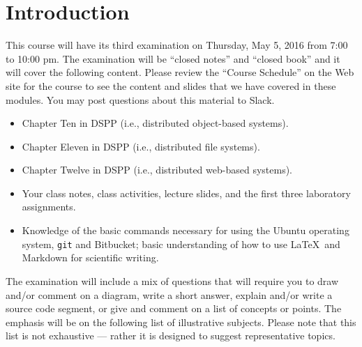 


\vspace*{-.35in}
\section*{Introduction}
\vspace*{-.05in}

This course will have its third examination on Thursday, May 5, 2016 from 7:00 to 10:00 pm. The examination will be
``closed notes'' and ``closed book'' and it will cover the following content. Please review the ``Course Schedule'' on
the Web site for the course to see the content and slides that we have covered in these modules. You may post questions
about this material to Slack.

\vspace*{-.05in}

\begin{itemize}

  \itemsep 0in

  \item Chapter Ten in DSPP (i.e., distributed object-based systems).

  \item Chapter Eleven in DSPP (i.e., distributed file systems).

  \item Chapter Twelve in DSPP (i.e., distributed web-based systems).

  \item Your class notes, class activities, lecture slides, and the first three laboratory assignments.

  \item Knowledge of the basic commands necessary for using the Ubuntu operating system, {\tt git} and Bitbucket; basic
    understanding of how to use \LaTeX~and Markdown for scientific writing.

\end{itemize}

\vspace*{-.05in}

\noindent The examination will include a mix of questions that will require you to draw and/or comment on a diagram,
write a short answer, explain and/or write a source code segment, or give and comment on a list of concepts or points.
The emphasis will be on the following list of illustrative subjects. Please note that this list is not exhaustive ---
rather it is designed to suggest representative topics.

